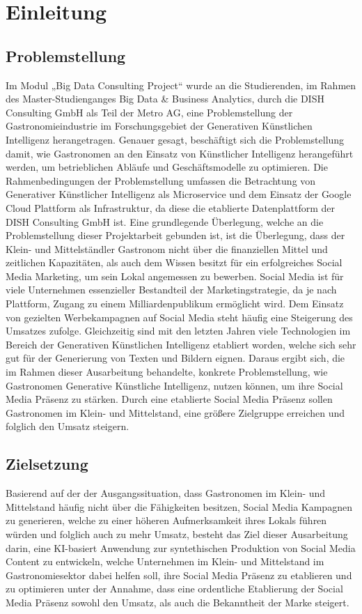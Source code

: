 \section{Einleitung}
\subsection{Problemstellung}
Im Modul „Big Data Consulting Project“ wurde an die Studierenden, im Rahmen des Master-Studienganges Big Data \& Business Analytics, durch die DISH Consulting GmbH als Teil der Metro AG, eine Problemstellung der Gastronomieindustrie im Forschungsgebiet der Generativen Künstlichen Intelligenz herangetragen.
Genauer gesagt, beschäftigt sich die Problemstellung damit, wie Gastronomen an den Einsatz von Künstlicher Intelligenz herangeführt werden, um betrieblichen Abläufe und Geschäftsmodelle zu optimieren.
Die Rahmenbedingungen der Problemstellung umfassen die Betrachtung von Generativer Künstlicher Intelligenz als Microservice und dem Einsatz der Google Cloud Plattform als Infrastruktur, da diese die etablierte Datenplattform der DISH Consulting GmbH ist.
Eine grundlegende Überlegung, welche an die Problemstellung dieser Projektarbeit gebunden ist, ist die Überlegung, dass der Klein- und Mittelständler Gastronom nicht über die finanziellen Mittel und zeitlichen Kapazitäten, als auch dem Wissen besitzt für ein erfolgreiches Social Media Marketing, um sein Lokal angemessen zu bewerben.
Social Media ist für viele Unternehmen essenzieller Bestandteil der Marketingstrategie, da je nach Plattform, Zugang zu einem Milliardenpublikum ermöglicht wird.
Dem Einsatz von gezielten Werbekampagnen auf Social Media steht häufig eine Steigerung des Umsatzes zufolge.
Gleichzeitig sind mit den letzten Jahren viele Technologien im Bereich der Generativen Künstlichen Intelligenz etabliert worden, welche sich sehr gut für der Generierung von Texten und Bildern eignen.
Daraus ergibt sich, die im Rahmen dieser Ausarbeitung behandelte, konkrete Problemstellung, wie Gastronomen Generative Künstliche Intelligenz, nutzen können, um ihre Social Media Präsenz zu stärken.
Durch eine etablierte Social Media Präsenz sollen Gastronomen im Klein- und Mittelstand, eine größere Zielgruppe erreichen und folglich den Umsatz steigern.

\subsection{Zielsetzung}
Basierend auf der der Ausgangssituation, dass Gastronomen im Klein- und Mittelstand häufig nicht über die Fähigkeiten besitzen, Social Media Kampagnen zu generieren, welche zu einer höheren Aufmerksamkeit ihres Lokals führen würden und folglich auch zu mehr Umsatz, besteht das Ziel dieser Ausarbeitung darin, eine KI-basiert Anwendung zur syntethischen Produktion von Social Media Content zu entwickeln, welche Unternehmen im Klein- und Mittelstand im Gastronomiesektor dabei helfen soll, ihre Social Media Präsenz zu etablieren und zu optimieren unter der Annahme, dass eine ordentliche Etablierung der Social Media Präsenz sowohl den Umsatz, als auch die Bekanntheit der Marke steigert.


